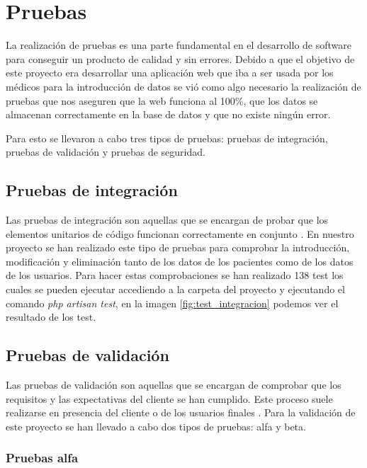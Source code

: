 \section{Pruebas}

La realización de pruebas es una parte fundamental en el desarrollo de software para conseguir un producto de calidad y sin errores. Debido a que el objetivo de este proyecto era desarrollar una aplicación web que iba a ser usada por los médicos para la introducción de datos se vió como algo necesario la realización de pruebas que nos aseguren que la web funciona al 100\%, que los datos se almacenan correctamente en la base de datos y que no existe ningún error.

Para esto se llevaron a cabo tres tipos de pruebas: pruebas de integración, pruebas de validación y pruebas de seguridad.

\subsection{Pruebas de integración}

Las pruebas de integración son aquellas que se encargan de probar que los elementos unitarios de código funcionan correctamente en conjunto \cite{pruebasIntegracion}. En nuestro proyecto se han realizado este tipo de pruebas para comprobar la introducción, modificación y eliminación tanto de los datos de los pacientes como de los datos de los usuarios. Para hacer estas comprobaciones se han realizado 138 test los cuales se pueden ejecutar accediendo a la carpeta del proyecto y ejecutando el comando \textit{php artisan test}, en la imagen \ref{fig:test_integracion} podemos ver el resultado de los test. 


\subsection{Pruebas de validación}

Las pruebas de validación son aquellas que se encargan de comprobar que los requisitos y las expectativas del cliente se han cumplido. Este proceso suele realizarse en presencia del cliente o de los usuarios finales \cite{validacion}. Para la validación de este proyecto se han llevado a cabo dos tipos de pruebas: alfa y beta.

\subsubsection{Pruebas alfa}

